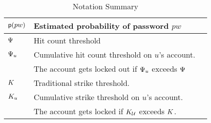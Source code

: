 \begin{table}[htb]
\begin{tabular}{|l|l|l|}
		$\textsf{p}(pw)$ & Estimated probability of password $pw$  \\\hline                    
		
		$\Psi$ & Hit count threshold \\\hline 
		
		$\Psi_{u}$ & Cumulative hit count threshold on $u$’s account. \\&The account gets locked out if $\Psi_{u}$ exceeds $\Psi$\\\hline
		
		$K$ & Traditional strike threshold. \\\hline
		
		$K_{u}$ & Cumulative strike threshold on $u$'s account. \\&The account gets locked if $K_{\mathcal{U}}$ exceeds $K$. \\\hline
		
		
		
		
		
		
		
		
		
	\end{tabular}
	
	\caption{Notation Summary}\label{table: notation}
	
	
\end{table}



